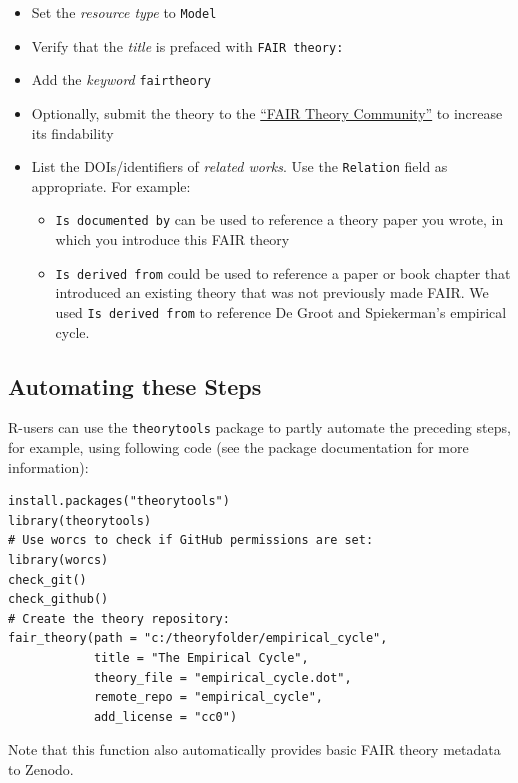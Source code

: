 \documentclass[
  man,floatsintext]{apa6}
\providecommand{\tightlist}{%
  \setlength{\itemsep}{0pt}\setlength{\parskip}{0pt}}
\begin{document}
\begin{itemize}
\tightlist
\item
  Set the \emph{resource type} to \texttt{Model}
\item
  Verify that the \emph{title} is prefaced with \texttt{FAIR\ theory:}
\item
  Add the \emph{keyword} \texttt{fairtheory}
\item
  Optionally, submit the theory to the \href{https://zenodo.org/communities/fairtheory}{``FAIR Theory Community''} to increase its findability
\item
  List the DOIs/identifiers of \emph{related works}. Use the \texttt{Relation} field as appropriate. For example:

  \begin{itemize}
  \tightlist
  \item
    \texttt{Is\ documented\ by} can be used to reference a theory paper you wrote, in which you introduce this FAIR theory
  \item
    \texttt{Is\ derived\ from} could be used to reference a paper or book chapter that introduced an existing theory that was not previously made FAIR. We used \texttt{Is\ derived\ from} to reference De Groot and Spiekerman's empirical cycle.
  \end{itemize}
\end{itemize}

\subsection{Automating these Steps}\label{automating-these-steps}

R-users can use the \texttt{theorytools} package to partly automate the preceding steps, for example, using following code (see the package documentation for more information):

\begin{verbatim}
install.packages("theorytools")
library(theorytools)
# Use worcs to check if GitHub permissions are set:
library(worcs)
check_git()
check_github()
# Create the theory repository:
fair_theory(path = "c:/theoryfolder/empirical_cycle",
            title = "The Empirical Cycle",
            theory_file = "empirical_cycle.dot",
            remote_repo = "empirical_cycle",
            add_license = "cc0")
\end{verbatim}

Note that this function also automatically provides basic FAIR theory metadata to Zenodo.
\end{document}
